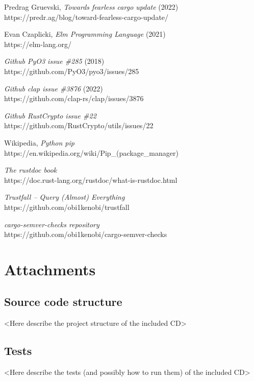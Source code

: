 \documentclass[licencjacka,en]{pracamgr}
\begin{document}
\begin{thebibliography}{99}
 Predrag Gruevski,
    \textit{Towards fearless cargo update} (2022) \\
    https://predr.ag/blog/toward-fearless-cargo-update/

 Evan Czaplicki,
    \textit{Elm Programming Language} (2021) \\
    https://elm-lang.org/

    \textit{Github PyO3 issue \#285} (2018) \\
    https://github.com/PyO3/pyo3/issues/285

    \textit{Github clap issue \#3876} (2022) \\
    https://github.com/clap-rs/clap/issues/3876

    \textit{Github RustCrypto issue \#22} \\
    https://github.com/RustCrypto/utils/issues/22

 Wikipedia,
	\textit{Python pip} \\
	https://en.wikipedia.org/wiki/Pip\_(package\_manager)

	\textit{The rustdoc book} \\
	https://doc.rust-lang.org/rustdoc/what-is-rustdoc.html

	\textit{Trustfall -- Query (Almost) Everything} \\
	https://github.com/obi1kenobi/trustfall

	\textit{cargo-semver-checks repository} \\
	https://github.com/obi1kenobi/cargo-semver-checks

\end{thebibliography}



\chapter*{Attachments}\label{r:chapter_attachments}

\section*{Source code structure}

<Here describe the project structure of the included CD>


\section*{Tests}

<Here describe the tests (and possibly how to run them) of the included CD>
\end{document}
